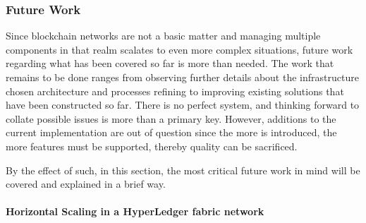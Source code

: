 \subsubsection{Future Work}
Since blockchain networks are not a basic matter and managing multiple components in that realm scalates to even more complex situations, future work regarding what has been covered so far is more than needed. The work that remains to be done ranges from observing further details about the infrastructure chosen architecture and processes refining to improving existing solutions that have been constructed so far. There is no perfect system, and thinking forward to collate possible issues is more than a primary key. However, additions to the current implementation are out of question since the more is introduced, the more features must be supported, thereby quality can be sacrificed.

By the effect of such, in this section, the most critical future work in mind will be covered and explained in a brief way.

\paragraph{Horizontal Scaling in a HyperLedger fabric network}\mbox{}\\

